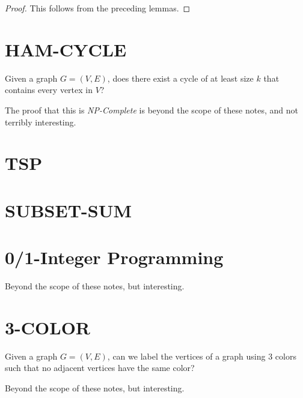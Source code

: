 \begin{proof}
  This follows from the preceding lemmas.
\end{proof}

\section{HAM-CYCLE}

Given a graph $G=(V,E)$, does there exist a cycle of at least size $k$
that contains every vertex in $V$?

The proof that this is \emph{NP-Complete} is beyond the scope of these
notes, and not terribly interesting.

\section{TSP}

\section{SUBSET-SUM}

\section{0/1-Integer Programming}

Beyond the scope of these notes, but interesting.

\section{3-COLOR}

Given a graph $G=(V,E)$, can we label the vertices of a graph using 3
colors such that no adjacent vertices have the same color?

Beyond the scope of these notes, but interesting.

